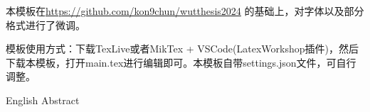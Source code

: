 \begin{WUTChineseabstract}

本模板在\url{https://github.com/kon9chun/wutthesis2024} 的基础上，对字体以及部分格式进行了微调。

模板使用方式：下载TexLive或者MikTex + VSCode(LatexWorkshop插件)，然后下载本模板，打开main.tex进行编辑即可。本模板自带settings.json文件，可自行调整。
\end{WUTChineseabstract}
\let\oldaddcontentsline\addcontentsline
\renewcommand{\addcontentsline}[3]{}
\begin{WUTEnglishabstract}
English Abstract
\end{WUTEnglishabstract}
\let\addcontentsline\oldaddcontentsline
{}




